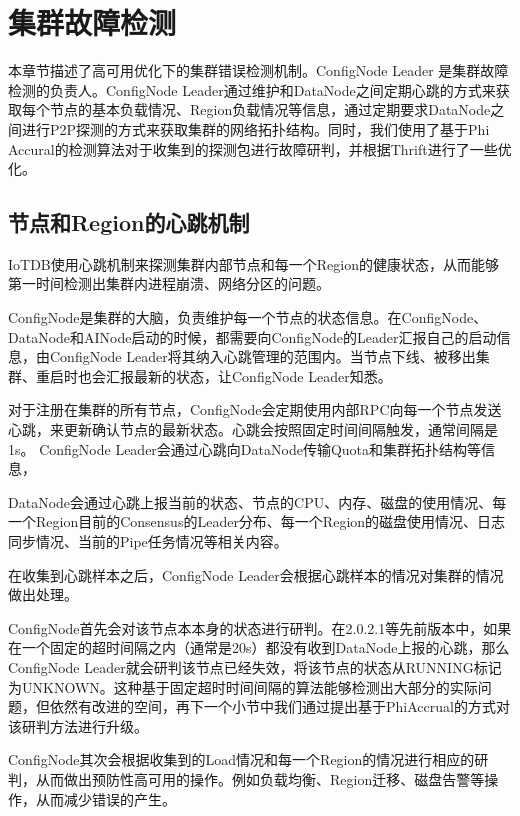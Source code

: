 
\chapter{集群故障检测}

本章节描述了高可用优化下的集群错误检测机制。ConfigNode Leader 是集群故障检测的负责人。ConfigNode Leader通过维护和DataNode之间定期心跳的方式来获取每个节点的基本负载情况、Region负载情况等信息，通过定期要求DataNode之间进行P2P探测的方式来获取集群的网络拓扑结构。同时，我们使用了基于Phi Accural的检测算法对于收集到的探测包进行故障研判，并根据Thrift进行了一些优化。

\section{节点和Region的心跳机制}

IoTDB使用心跳机制来探测集群内部节点和每一个Region的健康状态，从而能够第一时间检测出集群内进程崩溃、网络分区的问题。

ConfigNode是集群的大脑，负责维护每一个节点的状态信息。在ConfigNode、DataNode和AINode启动的时候，都需要向ConfigNode的Leader汇报自己的启动信息，由ConfigNode Leader将其纳入心跳管理的范围内。当节点下线、被移出集群、重启时也会汇报最新的状态，让ConfigNode Leader知悉。

对于注册在集群的所有节点，ConfigNode会定期使用内部RPC向每一个节点发送心跳，来更新确认节点的最新状态。心跳会按照固定时间间隔触发，通常间隔是1s。
ConfigNode Leader会通过心跳向DataNode传输Quota和集群拓扑结构等信息，

DataNode会通过心跳上报当前的状态、节点的CPU、内存、磁盘的使用情况、每一个Region目前的Consensus的Leader分布、每一个Region的磁盘使用情况、日志同步情况、当前的Pipe任务情况等相关内容。


在收集到心跳样本之后，ConfigNode Leader会根据心跳样本的情况对集群的情况做出处理。

ConfigNode首先会对该节点本本身的状态进行研判。在2.0.2.1等先前版本中，如果在一个固定的超时间隔之内（通常是20s）都没有收到DataNode上报的心跳，那么ConfigNode Leader就会研判该节点已经失效，将该节点的状态从RUNNING标记为UNKNOWN。这种基于固定超时时间间隔的算法能够检测出大部分的实际问题，但依然有改进的空间，再下一个小节中我们通过提出基于PhiAccrual的方式对该研判方法进行升级。

ConfigNode其次会根据收集到的Load情况和每一个Region的情况进行相应的研判，从而做出预防性高可用的操作。例如负载均衡、Region迁移、磁盘告警等操作，从而减少错误的产生。


